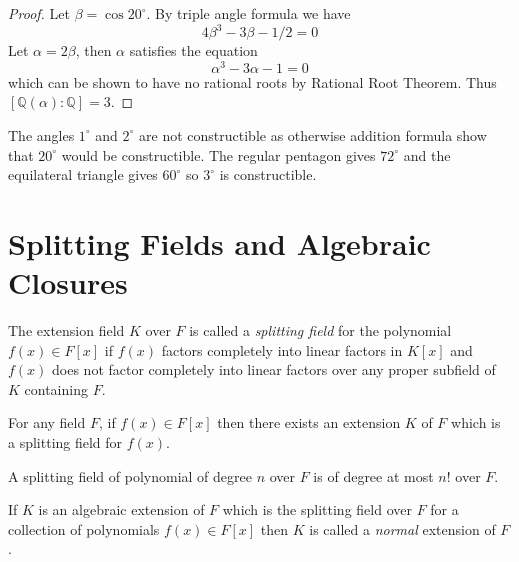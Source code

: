 \documentclass[a4paper]{article}
\begin{document}
\begin{proof}
  Let $\beta=\cos20^\circ$. By triple angle formula we have
  \[
    4\beta^3 -3\beta - 1/2 = 0
  \]
  Let $\alpha=2\beta$, then $\alpha$ satisfies the equation
  \[
    \alpha^3-3\alpha-1=0
  \]
  which can be shown to have no rational roots by Rational Root Theorem. Thus $[\mathbb{Q}(\alpha):\mathbb{Q}]=3$.
\end{proof}

\begin{remark}
  The angles $1^\circ$ and $2^\circ$ are not constructible as otherwise addition formula show that $20^\circ$ would be constructible. The regular pentagon gives $72^\circ$ and the equilateral triangle gives $60^\circ$ so $3^\circ$ is constructible.
\end{remark}

\section{Splitting Fields and Algebraic Closures}

\begin{definition}
  The extension field $K$ over $F$ is called a \emph{splitting field} for the polynomial $f(x)\in F[x]$ if $f(x)$ factors completely into linear factors in $K[x]$ and $f(x)$ does not factor completely into linear factors over any proper subfield of $K$ containing $F$.
\end{definition}

\begin{theorem}
  For any field $F$, if $f(x)\in F[x]$ then there exists an extension $K$ of $F$ which is a splitting field for $f(x)$.
\end{theorem}

\begin{proposition}
  A splitting field of polynomial of degree $n$ over $F$ is of degree at most $n!$ over $F$.
\end{proposition}

\begin{definition}
  If $K$ is an algebraic extension of $F$ which is the splitting field over $F$ for a collection of polynomials $f(x)\in F[x]$ then $K$ is called a \emph{normal} extension of $F$.
\end{definition}
\end{document}
